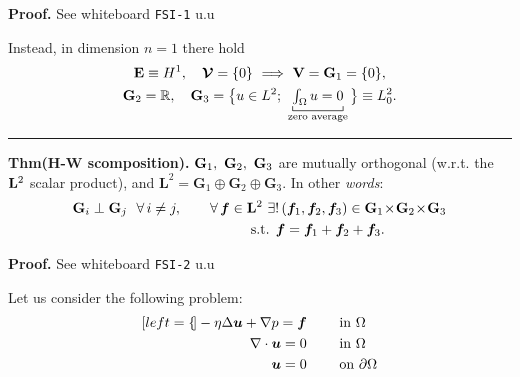 \textbf{\color{lavender(floral)}Proof.} See whiteboard \texttt{FSI-1} u.u

\smallskip

Instead, in dimension $n=1$ there hold
\begin{gather*}
\Ev\equiv H^1,\quad \bm\Vc=\{0\}\ \Longrightarrow\ \Vv=\Gv_1=\{0\},\\ \Gv_2=\RR,\quad \Gv_3=\big\{ u\in L^2;\ \underbracket[0.5pt]{\textstyle\int_\Omega u=0}_{\scriptstyle\text{zero average}}\big\}\equiv L^2_0.
\end{gather*}

\vspace{-0.5em}
\rule{0.495\textwidth}{0.2pt}\smallskip

\textbf{Thm(H-W scomposition).} $\mathbf{G}_1,\ \mathbf{G}_2,\ \mathbf{G}_3$ are mutually orthogonal (w.r.t. the $\mathbf{L}^2$ scalar product), and $\mathbf{L}^2=\mathbf{G}_{1}\oplus\mathbf{G}_{2}\oplus\mathbf{G}_{3}$. In other \emph{words}: 
\begin{gather*}
\mathbf{G}_{i}\perp\mathbf{G}_{j}\ \ \forall\,i\neq j,\qquad \forall\, \bm f \in \mathbf{L}^2\ \exists!\,(\bm f_1,\bm f_2,\bm f_3)\in\mathbf{G}_1\!\times\!\mathbf{G}_2\!\times\!\mathbf{G}_3 \\
\qquad\qquad\qquad\qquad\text{ s.t. }\bm f= \bm f_1+\bm f_2+\bm f_3.
\end{gather*}

\textbf{\color{lavender(floral)}Proof.} See whiteboard \texttt{FSI-2} u.u 

\noindent\rlap{\rule[1.5ex]{0.495\textwidth}{.2pt}}

\newcolumn




Let us consider the following problem:
\begin{subequations}
    \label{Stokes-problem}
    \begin{align}[left=\empheqlbrace]
    -\eta\Delta \bm u +\nabla p = \bm f &\qquad\text{ in }\Omega  \label{eq:sp1} \\
    \nabla\cdot \bm u=0 &\qquad\text{ in }\Omega \label{eq:sp2} \\
    \bm u=0 &\qquad\text{ on }\partial\Omega \label{eq:sp3}
    \end{align}
\end{subequations}


